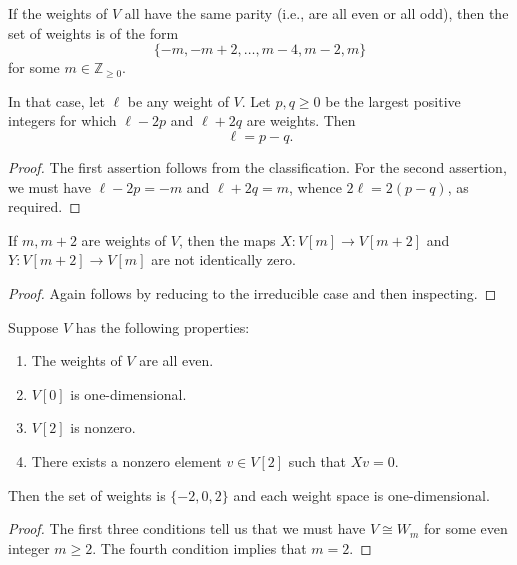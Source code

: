 \documentclass[reqno]{amsart} 
\begin{document}
\begin{lemma}\label{lem:sl2-recap-2}
  If the weights of $V$ all have the same parity (i.e., are all even or all odd), then the set of weights is of the form
  \begin{equation*}
    \{-m, -m + 2, \dotsc, m-4, m-2, m\}
  \end{equation*}
  for some $m \in \mathbb{Z}_{\geq 0}$.

  In that case, let $\ell$ be any weight of $V$.  Let $p,q \geq 0$ be the largest positive integers for which $\ell - 2 p$ and $\ell + 2 q$ are weights.  Then
  \begin{equation}
    \ell = p- q.
  \end{equation}
\end{lemma}
\begin{proof}
  The first assertion follows from the classification.  For the second assertion, we must have $\ell - 2 p = - m$ and $\ell + 2 q = m$, whence $2 \ell = 2 (p - q)$, as required.
\end{proof}

\begin{lemma}\label{lem:sl2-recap-3}
  If $m, m+2$ are weights of $V$, then the maps $X : V[m] \rightarrow V[m+2]$ and $Y : V[m+2] \rightarrow V[m]$ are not identically zero.


\end{lemma}
\begin{proof}
  Again follows by reducing to the irreducible case and then inspecting.
\end{proof}

\begin{lemma}\label{lem:sl2-recap-4}
  Suppose $V$ has the following properties:
  \begin{enumerate}
  \item The weights of $V$ are all even.
  \item $V[0]$ is one-dimensional.
  \item $V[2]$ is nonzero.
  \item There exists a nonzero element $v \in V[2]$ such that $X v = 0$.
  \end{enumerate}
  Then the set of weights is $\{-2,0,2\}$ and each weight space is one-dimensional.
\end{lemma}
\begin{proof}
  The first three conditions tell us that we must have $V \cong W_m$ for some even integer $m \geq 2$.  The fourth condition implies that $m = 2$.
\end{proof}
\end{document}
